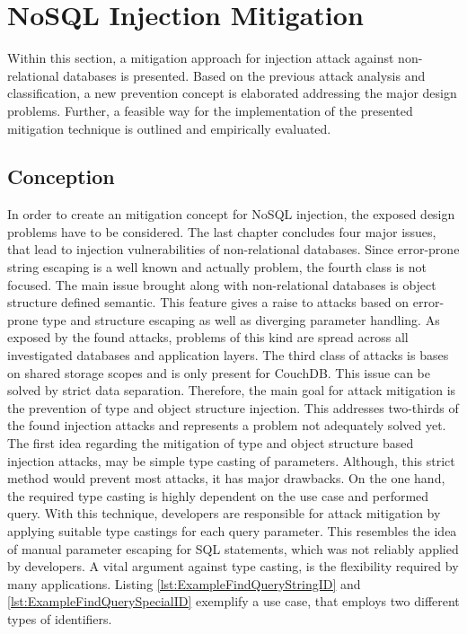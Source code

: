 \chapter{NoSQL Injection Mitigation}
Within this section, a mitigation approach for injection attack against non-relational databases is presented. Based on the previous attack analysis and classification, a new prevention concept is elaborated addressing the major design problems. Further, a feasible way for the implementation of the presented mitigation technique is outlined and empirically evaluated.

\section{Conception}
In order to create an mitigation concept for NoSQL injection, the exposed design problems have to be considered. The last chapter concludes four major issues, that lead to injection vulnerabilities of non-relational databases. Since error-prone string escaping is a well known and actually problem, the fourth class is not focused. The main issue brought along with non-relational databases is object structure defined semantic. This feature gives a raise to attacks based on error-prone type and structure escaping as well as diverging parameter handling. As exposed by the found attacks, problems of this kind are spread across all investigated databases and application layers. The third class of attacks is bases on shared storage scopes and is only present for CouchDB. This issue can be solved by strict data separation. Therefore, the main goal for attack mitigation is the prevention of type and object structure injection. This addresses two-thirds of the found injection attacks and represents a problem not adequately solved yet. \\

The first idea regarding the mitigation of type and object structure based injection attacks, may be simple type casting of parameters. Although, this strict method would prevent most attacks, it has major drawbacks. On the one hand, the required type casting is highly dependent on the use case and performed query. With this technique, developers are responsible for attack mitigation by applying suitable type castings for each query parameter. This resembles the idea of manual parameter escaping for SQL statements, which was not reliably applied by developers. A vital argument against type casting, is the flexibility required by many applications. Listing \ref{lst:ExampleFindQueryStringID} and \ref{lst:ExampleFindQuerySpecialID} exemplify a use case, that employs two different types of identifiers. \\

